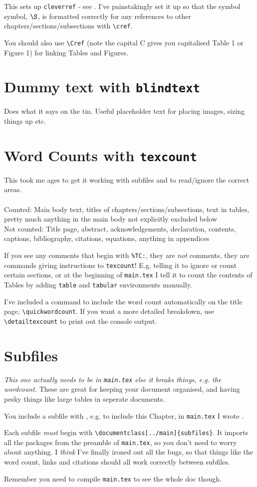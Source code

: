 \documentclass[../main]{subfiles}
\begin{document}
This sets up \texttt{cleverref} - see . I've painstakingly set it up so that the symbol symbol, $\S$, is formatted correctly for any references to other chapters/sections/subsections with \verb|\cref|.

You should also use \verb|\Cref| (note the capital C gives you capitalised Table 1 or Figure 1) for linking Tables and Figures.

\section{Dummy text with \texttt{blindtext}}

Does what it says on the tin. Useful placeholder text for placing images, sizing things up etc.

\section{Word Counts with \texttt{texcount}}
This took me ages to get it working with subfiles and to read/ignore the correct areas.\\
\\
\noindent Counted: Main body text, titles of chapters/sections/subsections, text in tables, pretty much anything in the main body not explicitly excluded below\\
Not counted: Title page, abstract, acknowledgements, declaration, contents, captions, bibliography, citations, equations, anything in appendices

If you see any comments that begin with \verb|%TC:|, they are \emph{not} comments, they are commands giving instructions to \texttt{texcount}! E.g. telling it to ignore or count certain sections, or at the beginning of \texttt{main.tex} I tell it to count the contents of Tables by adding \texttt{table} and \texttt{tabular} environments manually.

I've included a command to include the word count automatically on the title page, \verb|\quickwordcount|. If you want a more detailed breakdown, use \verb|\detailtexcount| to print out the console output.

\section{Subfiles}

\textit{This one actually needs to be in \texttt{main.tex} else it breaks things, e.g. the wordcount.} These are great for keeping your document organised, and having pesky things like large tables in seperate documents. 

You include a subfile with \verb||, e.g. to include this Chapter, in \texttt{main.tex} I wrote \verb||. 

Each subfile \emph{must} begin with \verb|\documentclass[../main]{subfiles}|. It imports all the packages from the preamble of \texttt{main.tex}, so you don't need to worry about anything. I \emph{think} I've finally ironed out all the bugs, so that things like the word count, links and citations should all work correctly between subfiles.

Remember you need to compile \texttt{main.tex} to see the whole doc though.
\end{document}

